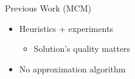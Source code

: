 \begin{frame}{Previous Work (MCM)}
\begin{itemize}
  \item<1-2> Heuristics + experiments
  	\begin{itemize}
  	  \item<2> Solution's quality \alert{matters}
	\end{itemize} 
  \item<3> No approximation algorithm
\end{itemize}
\end{frame}
